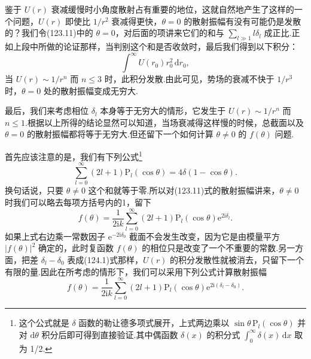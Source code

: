 鉴于 $U(r)$ 衰减缓慢时小角度散射占有重要的地位，这就自然地产生了这样的一个问题，$U(r)$ 即使比 $1/r^2$ 衰减得更快，$\theta=0$ 的散射振幅有没有可能仍是发散的？我们令(123.11)中的 $\theta=0$，对后面的项讲来它们的和与 $\sum_{l\gg1}l\delta_l$ 成正比.正如上段中所做的论证那样，当判别这个和是否收敛时，最后我们得到以下积分：
\begin{equation*}
  \int^{\infty}U(r_0)r_0^2\,\mathrm{d}r_0,
\end{equation*}
当 $U(r)\sim1/r^n$ 而 $n\leqslant3$ 时，此积分发散.由此可见，势场的衰减不快于 $1/r^3$ 时，$\theta=0$ 处的散射振幅变成无穷大.

最后，我们来考虑相位 $\delta_l$ 本身等于无穷大的情形，它发生于 $U(r)\sim1/r^n$ 而 $n\leqslant1$.根据以上所得的结论显然可以知道，当场衰减得这样慢的时候，总截面以及 $\theta=0$ 的散射振幅都将等于无穷大.但还留下一个如何计算 $\theta\neq0$ 的 $f(\theta)$ 问题.

首先应该注意的是，我们有下列公式\footnote{这个公式就是 $\delta$ 函数的勒让德多项式展开，上式两边乘以 $\sin\theta\,\mathrm{P}_l(\cos\theta)$ 并对 $\mathrm{d}\theta$ 积分后即可得到直接验证.其中偶函数 $\delta(x)$ 的积分式 $\int_0^{\infty}\delta(x)\,\mathrm{d}x$ 取为 1/2.}
\begin{equation}
  \sum_{l=0}^{\infty}(2l+1)\mathrm{P}_l(\cos\theta)
  =4\delta(1-\cos\theta).
\end{equation}
换句话说，只要 $\theta\neq0$ 这个和就等于零.所以对(123.11)式的散射振幅讲来，$\theta\neq0$ 时我们可以略去每项方括号内的1，留下
\begin{equation}
  f(\theta)=\frac{1}{2\mathrm{i}k}\sum_{l=0}^{\infty}(2l+1)
  \mathrm{P}_l(\cos\theta)\mathrm{e}^{2\mathrm{i}\delta_l}.
\end{equation}
如果上式右边乘一常数因子 $\mathrm{e}^{-2\mathrm{i}\delta_0}$ 截面不会发生改变，因为它是由模量平方 $|f(\theta)|^2$ 确定的，此时复函数 $f(\theta)$ 的相位只是改变了一个不重要的常数.另一方面，把差 $\delta_l-\delta_0$ 表成(124.1)式那样，$U(r)$ 的积分发散性就被消去，只留下一个有限的量.因此在所考虑的情形下，我们可以采用下列公式计算散射振幅
\begin{equation}
  f(\theta)=\frac{1}{2\mathrm{i}k}\sum_{l=0}^{\infty}(2l+1)
  \mathrm{P}_l(\cos\theta)\mathrm{e}^{2\mathrm{i}(\delta_l-\delta_0)}.
\end{equation}

